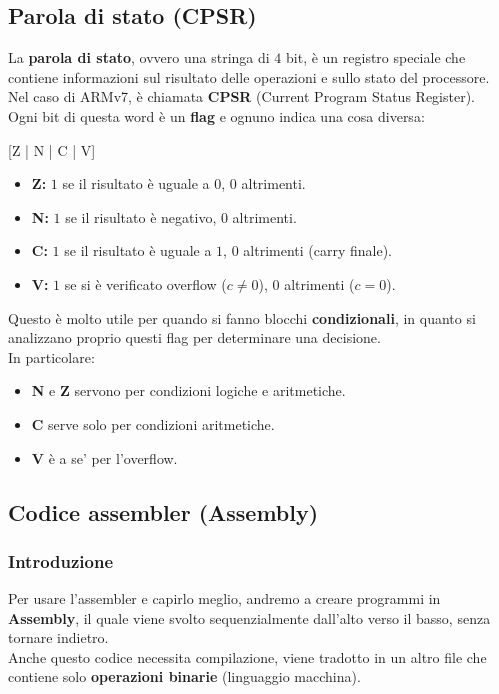 \documentclass[12pt,a4paper]{article}
\begin{document}
\subsection{Parola di stato (CPSR)}
La \textbf{parola di stato}, ovvero una stringa di $4$ bit, è un registro speciale che contiene informazioni sul risultato delle operazioni e sullo stato del processore.\\
Nel caso di ARMv7, è chiamata \textbf{CPSR} (Current Program Status Register).\\
Ogni bit di questa word è un \textbf{flag} e ognuno indica una cosa diversa:
\begin{center}
    [Z | N | C | V]
\end{center}
\begin{itemize}
    \item \textbf{Z:} $1$ se il risultato è uguale a $0$, $0$ altrimenti.
    \item \textbf{N:} $1$ se il risultato è negativo, $0$ altrimenti.
    \item \textbf{C:} $1$ se il risultato è uguale a $1$, $0$ altrimenti (carry finale).
    \item \textbf{V:} $1$ se si è verificato overflow ($c \ne 0$), $0$ altrimenti ($c = 0$).
\end{itemize}
Questo è molto utile per quando si fanno blocchi \textbf{condizionali}, in quanto si analizzano proprio questi flag per determinare una decisione.\\
In particolare:
\begin{itemize}
    \item \textbf{N} e \textbf{Z} servono per condizioni logiche e aritmetiche.
    \item \textbf{C} serve solo per condizioni aritmetiche.
    \item \textbf{V} è a se' per l'overflow.
\end{itemize}
\subsection{Codice assembler (Assembly)}
\subsubsection{Introduzione}
Per usare l'assembler e capirlo meglio, andremo a creare programmi in \textbf{Assembly}, il quale viene svolto sequenzialmente dall'alto verso il basso, senza tornare indietro.\\
Anche questo codice necessita compilazione, viene tradotto in un altro file che contiene solo \textbf{operazioni binarie} (linguaggio macchina).
\end{document}
